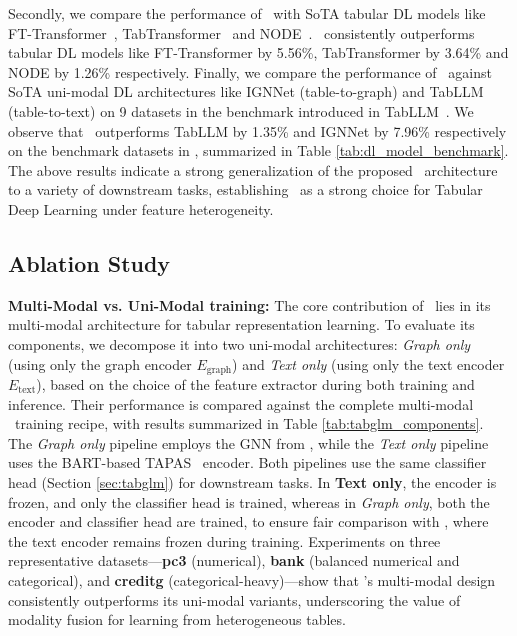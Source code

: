 Secondly, we compare the performance of \tabglm\ with SoTA tabular DL models like FT-Transformer~\cite{gorishniy2021revisiting}, TabTransformer~\cite{huang2020tabtransformer} and NODE~\cite{popov2019neural}. \tabglm\ consistently outperforms tabular DL models like FT-Transformer by 5.56\%, TabTransformer by 3.64\% and NODE by 1.26\% respectively.
Finally, we compare the performance of \tabglm\ against SoTA uni-modal DL architectures like IGNNet (table-to-graph) and TabLLM (table-to-text) on 9 datasets in the benchmark introduced in TabLLM~\citet{tabllm}. We observe that \tabglm\ outperforms TabLLM by 1.35\% and IGNNet by 7.96\% respectively on the benchmark datasets in \cite{tabllm}, summarized in Table \ref{tab:dl_model_benchmark}.
The above results indicate a strong generalization of the proposed \tabglm\ architecture to a variety of downstream tasks, establishing \tabglm\ as a strong choice for Tabular Deep Learning under feature heterogeneity.

\subsection{Ablation Study}
\label{sec:ablations}



\noindent \textbf{Multi-Modal vs. Uni-Modal training:}
The core contribution of \tabglm\ lies in its multi-modal architecture for tabular representation learning. To evaluate its components, we decompose it into two uni-modal architectures: \textit{Graph only} (using only the graph encoder $E_{\text{graph}}$) and \textit{Text only} (using only the text encoder $E_{\text{text}}$), based on the choice of the feature extractor during both training and inference. 
Their performance is compared against the complete multi-modal \tabglm\ training recipe, with results summarized in Table \ref{tab:tabglm_components}. 
The \textit{Graph only} pipeline employs the GNN from \cite{ignnet}, while the \textit{Text only} pipeline uses the BART-based TAPAS~\cite{tapas} encoder. 
Both pipelines use the same classifier head (Section \ref{sec:tabglm}) for downstream tasks. In \textbf{Text only}, the encoder is frozen, and only the classifier head is trained, whereas in \textit{Graph only}, both the encoder and classifier head are trained, to ensure fair comparison with \tabglm, where the text encoder remains frozen during training. 
Experiments on three representative datasets—\textbf{pc3} (numerical), \textbf{bank} (balanced numerical and categorical), and \textbf{creditg} (categorical-heavy)—show that \tabglm's multi-modal design consistently outperforms its uni-modal variants, underscoring the value of modality fusion for learning from heterogeneous tables.

